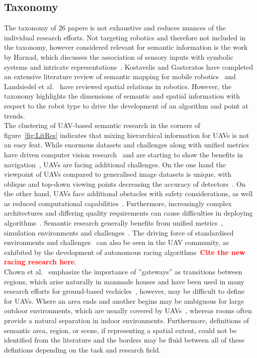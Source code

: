 \documentclass[twocolumn,letterpaper]{IEEEAerospaceCLS}  %
\newcommand\todo[1]{\textbf{\textcolor{red}{#1}}}
\begin{document}
\subsection{Taxonomy} \label{ssec:DiscLit}
The taxonomy of $26$ papers is not exhaustive and reduces nuances of the individual research efforts. Not targeting robotics and therefore not included in the taxonomy, however considered relevant for semantic information is the work by Harnad, which discusses the association of sensory inputs with symbolic systems and intricate representations~\cite{harnad_symbol_1990}. Kostavelis and Gasteratos have completed an extensive literature review of semantic mapping for mobile robotics~\cite{kostavelis_semantic_2015} and Landsiedel et al.~\cite{landsiedel_review_2017} have reviewed spatial relations in robotics. However, the taxonomy highlights the dimensions of semantic and spatial information with respect to the robot type to drive the development of an algorithm and point at trends.\\
The clustering of UAV-based semantic research in the corners of figure~\ref{fig:LitRes} indicates that mixing hierarchical information for UAVs is not an easy feat. While enormous datasets and challenges along with unified metrics have driven computer vision research~\cite{alom_history_2018,corke_what_2020} and are starting to show the benefits in navigation~\cite{anderson_evaluation_2018,chaplot_object_2020}, UAVs are facing additional challenges.
On the one hand the viewpoint of UAVs compared to generalised image datasets is unique, with oblique and top-down viewing points decreasing the accuracy of detectors~\cite{richardwebster_psyphy:_2019}. On the other hand, UAVs face additional obstacles with safety considerations, as well as reduced computational capabilities~\cite{boroujerdian_mavbench_2018,mandel_method_2020}. Furthermore, increasingly complex architectures and differing quality requirements can cause difficulties in deploying algorithms~\cite{cervera_try_2019,malatova_how_2020}. 
Semantic research generally benefits from unified metrics~\cite{anderson_evaluation_2018}, simulation environments and challenges~\cite{chaplot_object_2020,yang_visual_2018}. The driving force of standardised environments and challenges~\cite{corke_what_2020} can also be seen in the UAV community, as exhibited by the development of autonomous racing algorithms~\todo{Cite the new racing research here}.\\
Chown et al.~\cite{chown_prototypes_1995} emphasize the importance of ''gateways'' as transitions between regions, which arise naturally in manmade houses and have been used in many research efforts for ground-based vechicles~\cite{kuipers_local_2004,wu_learning_2018,krishnan_visual_2010}, however, may be difficult to define for UAVs. Where an area ends and another begins may be ambiguous for large outdoor environments, which are usually covered by UAVs~\cite{vanegas_novel_2018,shetty_implementation_2020}, whereas rooms often provide a natural separation in indoor environments. Furthermore, definitions of semantic area, region, or scene, if representing a spatial extent, could not be identified from the literature and the borders may be fluid between all of these defintions depending on the task and research field.
\end{document}
